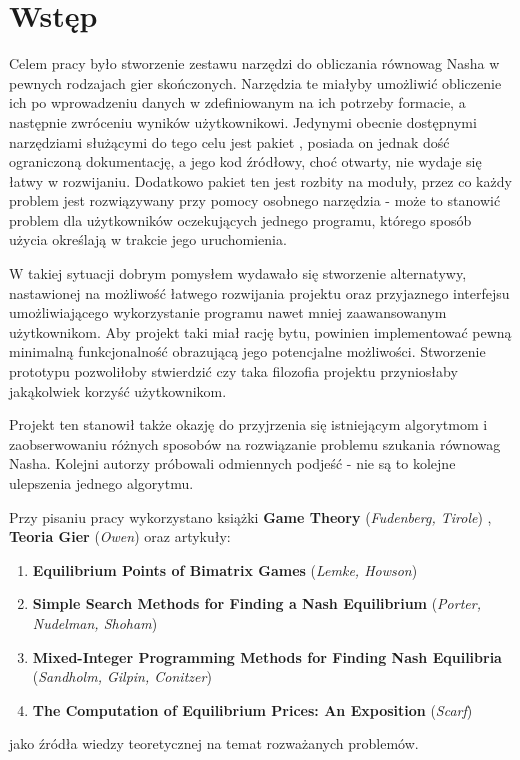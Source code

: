 \documentclass[polish]{standalone}
\begin{document}
\pagestyle{headings}

\section*{Wstęp}

Celem pracy było stworzenie zestawu narzędzi do obliczania równowag Nasha w pewnych rodzajach gier skończonych.
Narzędzia te miałyby umożliwić obliczenie ich po wprowadzeniu danych w zdefiniowanym na ich potrzeby formacie,
a następnie zwróceniu wyników użytkownikowi. Jedynymi obecnie dostępnymi narzędziami służącymi do tego celu jest pakiet
, posiada on jednak dość ograniczoną dokumentację, a jego kod źródłowy, choć otwarty, nie wydaje się łatwy
w rozwijaniu. Dodatkowo pakiet ten jest rozbity na moduły, przez co każdy problem jest rozwiązywany przy pomocy osobnego
narzędzia - może to stanowić problem dla użytkowników oczekujących jednego programu, którego sposób użycia określają
w trakcie jego uruchomienia.

W takiej sytuacji dobrym pomysłem wydawało się stworzenie alternatywy, nastawionej na możliwość łatwego rozwijania
projektu oraz przyjaznego interfejsu umożliwiającego wykorzystanie programu nawet mniej zaawansowanym użytkownikom. Aby
projekt taki miał rację bytu, powinien implementować pewną minimalną funkcjonalność obrazującą jego potencjalne
możliwości. Stworzenie prototypu pozwoliłoby stwierdzić czy taka filozofia projektu przyniosłaby jakąkolwiek korzyść
użytkownikom.

Projekt ten stanowił także okazję do przyjrzenia się istniejącym algorytmom i zaobserwowaniu różnych sposobów na
rozwiązanie problemu szukania równowag Nasha. Kolejni autorzy próbowali odmiennych podjeść - nie są to kolejne ulepszenia
jednego algorytmu.

Przy pisaniu pracy wykorzystano książki \textbf{Game Theory} (\textit{Fudenberg, Tirole}) \cite{FT-GT},
\textbf{Teoria Gier} (\textit{Owen}) \cite{O-GT} oraz artykuły:
\begin{enumerate}
\item \textbf{Equilibrium Points of Bimatrix Games} (\textit{Lemke, Howson})
\cite{LH-NE}
\item \textbf{Simple Search Methods for Finding a Nash Equilibrium} (\textit{Porter, Nudelman, Shoham})
\cite{PNS-NE}
\item \textbf{Mixed-Integer Programming Methods for Finding Nash Equilibria} (\textit{Sandholm, Gilpin, Conitzer})
\cite{SCG-NE}
\item \textbf{The Computation of Equilibrium Prices: An Exposition} (\textit{Scarf})
\cite{SCARF-NR}
\end{enumerate}
jako źródła wiedzy teoretycznej na temat rozważanych problemów.
\end{document}
